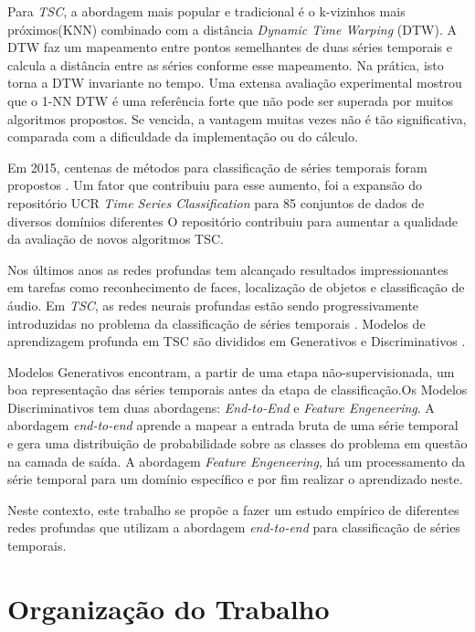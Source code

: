 Para \textit{TSC}, a abordagem mais popular e tradicional é o k-vizinhos mais próximos(KNN) combinado com a distância \textit{Dynamic Time Warping} (DTW). A DTW faz um mapeamento entre pontos semelhantes de duas séries temporais e calcula a distância entre as séries conforme esse mapeamento. Na prática, isto torna a DTW invariante no tempo.  Uma extensa avaliação experimental \cite{Bagnall2017} mostrou que o 1-NN DTW é uma referência forte que não pode ser superada por muitos algoritmos propostos. Se vencida, a vantagem muitas vezes não é tão significativa, comparada com a dificuldade da implementação ou do cálculo.

Em 2015, centenas de métodos para classificação de séries temporais foram propostos \cite{Bagnall2017}. Um fator que contribuiu para esse aumento, foi  a expansão do repositório UCR \textit{Time Series Classification} para 85 conjuntos de dados de diversos domínios diferentes  O repositório contribuiu para aumentar a qualidade da avaliação de novos algoritmos TSC. 

Nos últimos anos as redes profundas tem alcançado resultados impressionantes em tarefas como reconhecimento de faces, localização de objetos e classificação de áudio. Em \textit{TSC}, as redes neurais profundas estão sendo progressivamente introduzidas no problema da classificação de séries temporais \cite{Zheng2014} \cite{Wang01}  \cite{tscFromScratch}. Modelos de aprendizagem profunda em TSC são divididos em Generativos e Discriminativos \cite{ismail2018}.

Modelos Generativos encontram, a partir de uma etapa não-supervisionada, um boa representação das séries temporais antes da etapa de classificação.Os Modelos Discriminativos tem duas abordagens: \textit{End-to-End} e \textit{Feature Engeneering}. A abordagem \textit{end-to-end} aprende a mapear a entrada bruta de uma série temporal e gera uma distribuição de probabilidade sobre as classes do problema em questão na camada de saída. A abordagem \textit{Feature Engeneering}, há um processamento da série temporal para um domínio específico e por fim realizar o aprendizado neste. 

Neste contexto, este trabalho se propõe a fazer um estudo empírico de diferentes redes profundas que utilizam a abordagem \textit{end-to-end} para classificação de séries temporais.




\section{Organização do Trabalho}

